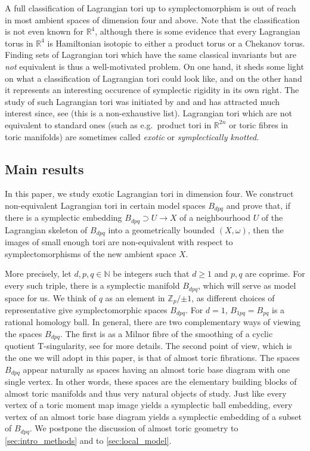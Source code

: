 \documentclass[12pt,a4paper,abstract=true,draft]{scrartcl}
\begin{document}
A full classification of Lagrangian tori up to symplectomorphism is out of reach in most ambient spaces of dimension four and above.
Note that the classification is not even known for $\mathbb{R}^4$, although there is some evidence \cite{Riz19} that every Lagrangian torus in $\mathbb{R}^4$ is Hamiltonian isotopic to either a product torus or a Chekanov torus.
Finding sets of Lagrangian tori which have the same classical invariants but are \emph{not} equivalent is thus a well-motivated problem.
On one hand, it sheds some light on what a classification of Lagrangian tori could look like, and on the other hand it represents an interesting occurence of symplectic rigidity in its own right.
The study of such Lagrangian tori was initiated by \cite{Che96} and \cite{EliPol97} and has attracted much interest since,  see \cite{Aur15, brendel2020real, CheSch10, FOOO12, GalMik22, SheTonVia19, Via17, Via16} (this is a non-exhaustive list).
Lagrangian tori which are not equivalent to standard ones (such as e.g.\ product tori in $\mathbb{R}^{2n}$ or toric fibres in toric manifolds) are sometimes called \emph{exotic} or \emph{symplectically knotted}. 

\subsection{Main results}
\label{sec:intro_main_results}

In this paper, we study exotic Lagrangian tori in dimension four.
We construct non-equivalent Lagrangian tori in certain model spaces $B_{dpq}$ and prove that, if there is a symplectic embedding $B_{dpq} \supset U \rightarrow X$ of a neighbourhood $U$ of the Lagrangian skeleton of $B_{dpq}$ into a geometrically bounded $(X,\omega)$, then the images of small enough tori are non-equivalent with respect to symplectomorphisms of the new ambient space $X$.

More precisely, let $d,p,q \in \mathbb{N}$ be integers such that $d≥1$ and $p,q$ are coprime.
For every such triple, there is a symplectic manifold $B_{dpq}$, which will serve as model space for us. 
We think of $q$ as an element in $ℤ_p / {±1}$, as different choices of representative give symplectomorphic spaces $B_{dpq}$.
For $d=1$, $B_{1pq} = B_{pq}$ is a rational homology ball.
In general, there are two complementary ways of viewing the spaces $B_{dpq}$.
The first is as a Milnor fibre of the smoothing of a cyclic quotient T-singularity, see \cite[Section 7.4]{evans2021atfs} for more details.
The second point of view, which is the one we will adopt in this paper, is that of almost toric fibrations.
The spaces $B_{dpq}$ appear naturally as spaces having an almost toric base diagram with one single vertex.
In other words, these spaces are the elementary building blocks of almost toric manifolds and thus very natural objects of study.
Just like every vertex of a toric moment map image yields a symplectic ball embedding, every vertex of an almost toric base diagram yields a symplectic embedding of a subset of $B_{dpq}$.
We postpone the discussion of almost toric geometry to \cref{sec:intro_methods} and to \cref{sec:local_model}. 
\end{document}
